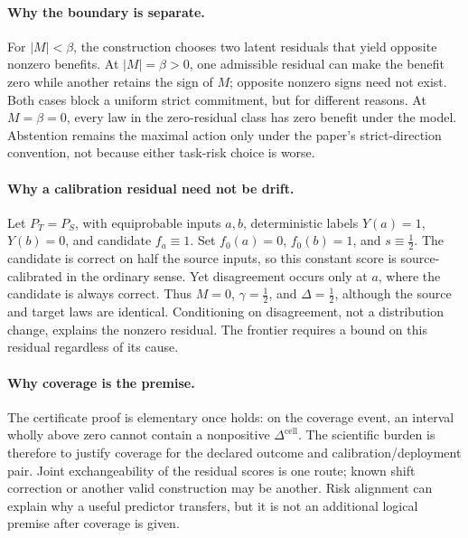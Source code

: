 \paragraph{Why the boundary is separate.}
For $|M|<\beta$, the construction chooses two latent residuals that yield opposite nonzero benefits.
At $|M|=\beta>0$, one admissible residual can make the benefit zero while another retains the sign of
$M$; opposite nonzero signs need not exist. Both cases block a uniform strict commitment, but for
different reasons. At $M=\beta=0$, every law in the zero-residual class has zero benefit under the
model. Abstention remains the maximal action only under the paper's strict-direction convention,
not because either task-risk choice is worse.

\paragraph{Why a calibration residual need not be drift.}
Let $P_T=P_S$, with equiprobable inputs $a,b$, deterministic labels $Y(a)=1$, $Y(b)=0$,
and candidate $f_a\equiv1$. Set $f_0(a)=0$, $f_0(b)=1$, and $s\equiv\tfrac12$.
The candidate is correct on half the source inputs, so this constant score is source-calibrated
in the ordinary sense. Yet disagreement occurs only at $a$, where the candidate is always
correct. Thus $M=0$, $\gamma=\tfrac12$, and $\Delta=\tfrac12$, although the source and target
laws are identical. Conditioning on disagreement, not a distribution change, explains the
nonzero residual. The frontier requires a bound on this residual regardless of its cause.

\paragraph{Why coverage is the premise.}
The certificate proof is elementary once  holds: on the coverage
event, an interval wholly above zero cannot contain a nonpositive $\Delta^{\mathrm{cell}}$. The
scientific burden is therefore to justify coverage for the declared outcome and
calibration/deployment pair. Joint exchangeability of the residual scores is one route;
known shift correction or another valid construction may be another. Risk alignment can explain why
a useful predictor transfers, but it is not an additional logical premise after coverage is given.

